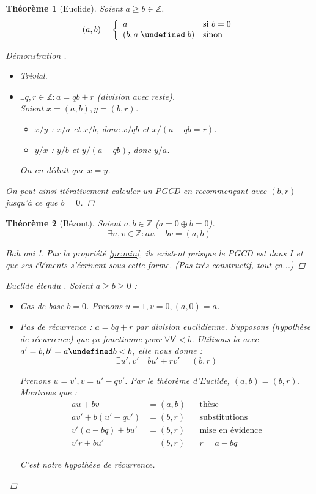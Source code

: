 \documentclass[11pt,twocolumn]{article}
\let\mod\undefined
\DeclareMathOperator{\mod}{mod}
\theoremstyle{plain}
\newtheorem{thm}{Théorème}
\newcommand{\esZ}{\mathbb{Z}} %
\newenvironment{cproof}[1]{\begin{proof}[Démonstration \cite{#1}]}{\end{proof}}
\begin{document}
\begin{thm}[Euclide]
	Soient $a \geq b \in \esZ$. \[
		(a, b) = \left\{
			\begin{array}{ll}
				a & \text{si } b=0 \\
				(b, a \; \mod \; b) & \text{sinon} \\
			\end{array}
		\right.
	\]
	\begin{cproof}{Conlen} ~
		\begin{itemize}
			\item[$b=0$] Trivial.
			\item[$b\neq0$]
				$\exists q, r \in \esZ : a = qb+r$ (division avec reste). \\
				Soient $x=(a,b), y=(b,r)$.
				\begin{itemize}
					\item $x/y$ : $x/a$ et $x/b$, donc $x/qb$ et $x/(a-qb=r)$.
					\item $y/x$ : $y/b$ et $y/(a-qb)$, donc $y/a$.
				\end{itemize}
				On en déduit que $x=y$.
		\end{itemize}
		On peut ainsi itérativement calculer un PGCD en recommençant avec
		$(b,r)$ jusqu'à ce que $b=0$.
	\end{cproof}
\end{thm}
\begin{thm}[Bézout]
	Soient $a, b \in \esZ$ ($a=0 \oplus b=0$). \[
		\exists u, v \in \esZ : au+bv = (a, b)
	\]
	\begin{proof}[Bah oui !]
		Par la propriété \ref{pr:min}, ils existent puisque le PGCD est dans $I$
		et que ses éléments s'écrivent sous cette forme.
		\emph{(Pas très constructif, tout ça...)}
	\end{proof}
	\begin{proof}[Euclide étendu \cite{Gillis}]
		Soient $a \geq b \geq 0$ :
		\begin{itemize}
			\item Cas de base $b=0$. Prenons $u=1, v=0, (a,0)=a$.
			\item Pas de récurrence : $a=bq+r$ par division euclidienne.
				Supposons (hypothèse de récurrence) que
				ça fonctionne pour $\forall b'<b$.
				Utilisons-la avec $a'=b, b'=a\mod b<b$, elle nous donne : \[
					\exists u', v' \quad bu'+rv' = (b,r)
				\]

				Prenons $u=v', v=u'-qv'$.
				Par le théorème d'Euclide, $(a,b)=(b,r)$.
				Montrons que :
				\begin{align*}
					au+bv&=(a,b) && \text{thèse} \\
					av'+b\left(u'-qv'\right)&=(b,r) && \text{substitutions} \\
					v'\left(a-bq\right)+bu'&=(b,r) && \text{mise en évidence} \\
					v'r+bu'&=(b,r) && r=a-bq
				\end{align*}

				C'est notre hypothèse de récurrence.
		\end{itemize}
	\end{proof}
\end{thm}
\end{document}
